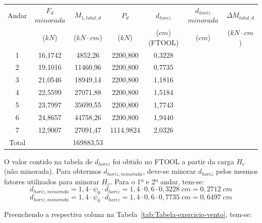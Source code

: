 \begin{table}[H]
\centering
\begin{tabular}{c|c|c|ccc|c}
\hline
Andar & $F_d$ $minorada$ & $M_{1, total, d}$ & \multicolumn{1}{c|}{$P_d$} & \multicolumn{1}{c|}{$d_{horiz}$} & $d_{horiz}$ $minorada$ & $\Delta M_{total, d}$ \\
 & ($kN$) & ($kN\cdot cm$) & \multicolumn{1}{c|}{($kN$)} & \multicolumn{1}{c|}{($cm$) (FTOOL)} & ($cm$) & ($kN\cdot cm$) \\ \hline
1 & 16,1742 & 4852,26 & \multicolumn{1}{c|}{2200,800} & \multicolumn{1}{c|}{0,3228} &  &  \\
2 & 19,1016 & 11460,96 & \multicolumn{1}{c|}{2200,800} & \multicolumn{1}{c|}{0,7735} &  &  \\
3 & 21,0546 & 18949,14 & \multicolumn{1}{c|}{2200,800} & \multicolumn{1}{c|}{1,1816} &  &  \\
4 & 22,5599 & 27071,88 & \multicolumn{1}{c|}{2200,800} & \multicolumn{1}{c|}{1,5184} &  &  \\
5 & 23,7997 & 35699,55 & \multicolumn{1}{c|}{2200,800} & \multicolumn{1}{c|}{1,7743} &  &  \\
6 & 24,8657 & 44758,26 & \multicolumn{1}{c|}{2200,800} & \multicolumn{1}{c|}{1,9440} &  &  \\
7 & 12,9007 & 27091,47 & \multicolumn{1}{c|}{1114,9824} & \multicolumn{1}{c|}{2,0326} &  &  \\ \hline
Total &  & 169883,53 &  &  &  &  \\ \cline{1-1} \cline{3-3} \cline{7-7} 
\end{tabular}
\end{table}

O valor contido na tabela de $d_{horiz}$ foi obtido no FTOOL a partir da carga $H_v$ (não minorada). Para obtermos $d_{horiz, minorada}$, deve-se minorar $d_{horiz}$ pelos mesmos fatores utilizados para minorar $H_v$. Para o 1º e 2º andar, tem-se:
$$d_{horiz, minorada}=1,4\cdot\psi_0\cdot d_{horiz}=1,4\cdot0,6\cdot 0,3228\;cm=0,2712\;cm$$ $$d_{horiz, minorada}=1,4\cdot\psi_0\cdot d_{horiz}=1,4\cdot0,6\cdot 0,7735\;cm=0,6497\;cm$$

Preenchendo a respectiva coluna na Tabela~\ref{tab:Tabela-exercicio-vento}, tem-se:

